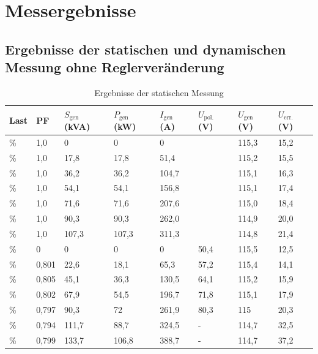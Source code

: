 \chapter{Messergebnisse}
\label{chap:Anhang}
\section{Ergebnisse der statischen und dynamischen Messung ohne Reglerveränderung}\label{sec:MessergebnisseOhneRegleranderung}

\begin{longtable}[]{llllllll}
\caption{Ergebnisse der statischen Messung}
\tabularnewline
\toprule
Last  & PF    & $S_{\mathrm{gen}}$ (kVA) & $P_{\mathrm{gen}}$ (kW) & $I_{\mathrm{gen}}$ (A) & $U_{\mathrm{pol.}}$ (V) & $U_{\mathrm{gen}}$ (V) & $U_{\mathrm{err.}}$ (V) \\ 
\midrule
\endhead
\unit[0]{\%}   & 1,0   & 0          & 0         & 0        &           & 115,3    & 15,2      \\
\unit[25]{\%}  & 1,0   & 17,8       & 17,8      & 51,4     &           & 115,2    & 15,5      \\
\unit[50]{\%}  & 1,0   & 36,2       & 36,2      & 104,7    &           & 115,1    & 16,3      \\
\unit[75]{\%}  & 1,0   & 54,1       & 54,1      & 156,8    &           & 115,1    & 17,4      \\
\unit[100]{\%} & 1,0   & 71,6       & 71,6      & 207,6    &           & 115,0    & 18,4      \\
\unit[125]{\%} & 1,0   & 90,3       & 90,3      & 262,0    &           & 114,9    & 20,0      \\
\unit[150]{\%} & 1,0   & 107,3      & 107,3     & 311,3    &           & 114,8    & 21,4      \\ \midrule
\unit[0]{\%}   & 0     & 0          & 0         & 0        & 50,4      & 115,5    & 12,5      \\
\unit[25]{\%}  & 0,801 & 22,6       & 18,1      & 65,3     & 57,2      & 115,4    & 14,1      \\
\unit[50]{\%}  & 0,805 & 45,1       & 36,3      & 130,5    & 64,1      & 115,2    & 15,9      \\
\unit[75]{\%}  & 0,802 & 67,9       & 54,5      & 196,7    & 71,8      & 115,1    & 17,9      \\
\unit[100]{\%} & 0,797 & 90,3       & 72        & 261,9    & 80,3      & 115      & 20,3      \\
\unit[125]{\%} & 0,794 & 111,7      & 88,7      & 324,5    & -         & 114,7    & 32,5      \\
\unit[150]{\%} & 0,799 & 133,7      & 106,8     & 388,7    & -         & 114,7    & 37,2      \\ \bottomrule
\end{longtable}


